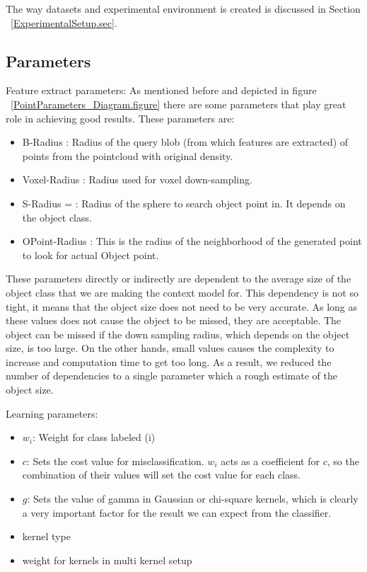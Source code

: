 The way datasets and experimental environment is created is discussed in Section ~\ref{ExperimentalSetup.sec}.


\subsection{Parameters}
\label{Parameters.ssec}

Feature extract parameters:
As mentioned before and depicted in figure ~\ref{PointParameters_Diagram.figure} there are some parameters that play great role in
achieving good results. 
These parameters are:

\begin{itemize}
 \item  B-Radius : Radius of the query blob (from which features are extracted) of points from the pointcloud with original
 density.
 \item Voxel-Radius : Radius used for voxel down-sampling. 
 \item S-Radius = : Radius of the sphere to search object point in. 
 It depends on the object class.
 \item OPoint-Radius : This is the radius of the neighborhood of the generated point to look for actual Object point.
\end{itemize}

These parameters directly or indirectly are dependent to the average size of the object class that we are making the context model
for. 
This dependency is not so tight, it means that the object size does not need to be very accurate. 
As long as these values does not cause the object to be missed, they are acceptable.
The object can be missed if the down sampling radius, which depends on the object size, is too large. 
On the other hands, small values causes the complexity to increase and computation time to get too long.  
As a result, we reduced the number of dependencies to a single parameter which a rough estimate of the object size.


Learning parameters:
\begin{itemize}
 \item $w_i$: Weight for class labeled (i)
 \item $c$: Sets the cost value for misclassification.
 $w_i$ acts as a coefficient for $c$, so the combination of their values will set the cost value for each class.
 \item $g$: Sets the value of gamma in Gaussian or chi-square kernels, which is clearly a very important factor for the result we can 
expect from the classifier. 
 \item kernel type
 \item weight for kernels in multi kernel setup
\end{itemize}


